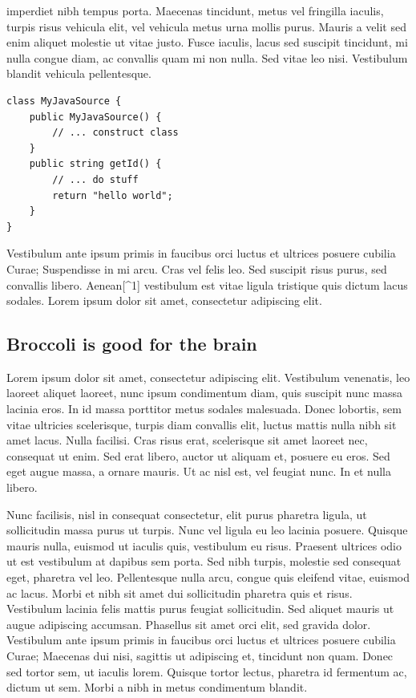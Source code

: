 imperdiet nibh tempus porta. Maecenas tincidunt, metus vel fringilla
iaculis, turpis risus vehicula elit, vel vehicula metus urna mollis
purus. Mauris a velit sed enim aliquet molestie ut vitae justo. Fusce
iaculis, lacus sed suscipit tincidunt, mi nulla congue diam, ac
convallis quam mi non nulla. Sed vitae leo nisi. Vestibulum blandit
vehicula pellentesque.

\begin{minipage}{0.95\textwidth}\begin{lstlisting}
class MyJavaSource {
    public MyJavaSource() {
        // ... construct class
    }
    public string getId() {
        // ... do stuff
        return "hello world";
    }
}
\end{lstlisting}\end{minipage}

Vestibulum ante ipsum primis in faucibus orci luctus et ultrices posuere
cubilia Curae; Suspendisse in mi arcu. Cras vel felis leo. Sed suscipit
risus purus, sed convallis libero. Aenean{[}\^{}1{]} vestibulum est
vitae ligula tristique quis dictum lacus sodales. Lorem ipsum dolor sit
amet, consectetur adipiscing elit.

\subsection{Broccoli is good for the brain}

Lorem ipsum dolor sit amet, consectetur adipiscing elit. Vestibulum
venenatis, leo laoreet aliquet laoreet, nunc ipsum condimentum diam,
quis suscipit nunc massa lacinia eros. In id massa porttitor metus
sodales malesuada. Donec lobortis, sem vitae ultricies scelerisque,
turpis diam convallis elit, luctus mattis nulla nibh sit amet lacus.
Nulla facilisi. Cras risus erat, scelerisque sit amet laoreet nec,
consequat ut enim. Sed erat libero, auctor ut aliquam et, posuere eu
eros. Sed eget augue massa, a ornare mauris. Ut ac nisl est, vel feugiat
nunc. In et nulla libero.

Nunc facilisis, nisl in consequat consectetur, elit purus pharetra
ligula, ut sollicitudin massa purus ut turpis. Nunc vel ligula eu leo
lacinia posuere. Quisque mauris nulla, euismod ut iaculis quis,
vestibulum eu risus. Praesent ultrices odio ut est vestibulum at dapibus
sem porta. Sed nibh turpis, molestie sed consequat eget, pharetra vel
leo. Pellentesque nulla arcu, congue quis eleifend vitae, euismod ac
lacus. Morbi et nibh sit amet dui sollicitudin pharetra quis et risus.
Vestibulum lacinia felis mattis purus feugiat sollicitudin. Sed aliquet
mauris ut augue adipiscing accumsan. Phasellus sit amet orci elit, sed
gravida dolor. Vestibulum ante ipsum primis in faucibus orci luctus et
ultrices posuere cubilia Curae; Maecenas dui nisi, sagittis ut
adipiscing et, tincidunt non quam. Donec sed tortor sem, ut iaculis
lorem. Quisque tortor lectus, pharetra id fermentum ac, dictum ut sem.
Morbi a nibh in metus condimentum blandit.

